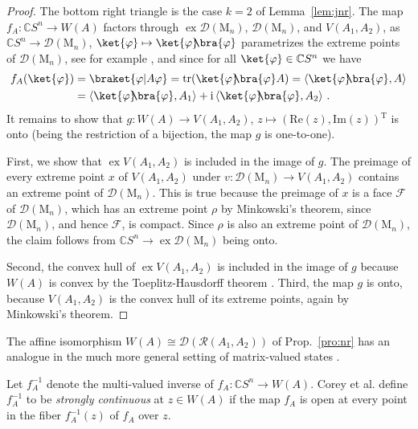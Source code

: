 \documentclass[a4paper,11pt,reqno]{amsart}
\newcommand{\C}{\mathbb{C}}
\newcommand{\M}{\mathrm{M}}
\newcommand{\cD}{\mathcal{D}}
\newcommand{\cF}{\mathcal{F}}
\newcommand{\cR}{\mathcal{R}}
\newcommand{\ii}{\mathrm{i}}
\renewcommand\Im{\mathrm{Im}}
\renewcommand\Re{\mathrm{Re}}
\newcommand{\tp}{{}^\mathrm{T}}
\DeclareMathOperator\ex{ex}
\DeclareMathOperator\tr{tr}
\theoremstyle{definition}
\theoremstyle{remark}
\numberwithin{equation}{section}
\begin{document}
\begin{proof}
The bottom right triangle is the case $k=2$ of Lemma~\ref{lem:jnr}. The 
map $f_A:\C S^n\to W(A)$ factors through $\ex\cD(\M_n)$, $\cD(\M_n)$, 
and $V(A_1,A_2)$, as $\C S^n\to\cD(\M_n)$, 
$\ket{\varphi}\mapsto\ket{\varphi}\!\!\bra{\varphi}$ parametrizes the 
extreme points of $\cD(\M_n)$, see for example 
\cite[Sec.~5.1]{BengtssonZyczkowski2017}, and since for all 
$\ket{\varphi}\in\C S^n$ we have
\begin{align*}
f_A(\ket{\varphi})
&=\braket{\varphi|A\varphi}
=\tr(\ket{\varphi}\!\!\bra{\varphi}A)
=\left\langle\ket{\varphi}\!\!\bra{\varphi},A\right\rangle\\
&=\left\langle\ket{\varphi}\!\!\bra{\varphi},A_1\right\rangle
+\ii\left\langle\ket{\varphi}\!\!\bra{\varphi},A_2\right\rangle\,.
\end{align*}
It remains to show that $g:W(A)\to V(A_1,A_2)$, $z\mapsto(\Re(z),\Im(z))\tp$ 
is onto (being the restriction of a bijection, the map $g$ is one-to-one). 
\par
%
First, we show that $\ex V(A_1,A_2)$ is included in the image of $g$. The 
preimage of every extreme point $x$ of $V(A_1,A_2)$ under 
$v:\cD(\M_n)\to V(A_1,A_2)$ contains an extreme point of $\cD(\M_n)$. This 
is true because the preimage of $x$ is a face $\cF$ of $\cD(\M_n)$, which 
has an extreme point $\rho$ by Minkowski's theorem, since $\cD(\M_n)$, and 
hence $\cF$, is compact. Since $\rho$ is also an extreme point of $\cD(\M_n)$, 
the claim follows from $\C S^n\to\ex\cD(\M_n)$ being onto. 
\par
%
Second, the convex hull of $\ex V(A_1,A_2)$ is included in the image of $g$
because $W(A)$ is convex by the Toeplitz-Hausdorff theorem 
\cite{Davis1971,MaierNetzer2024}. Third, the map $g$ is onto, because 
$V(A_1,A_2)$ is the convex hull of its extreme points, again by Minkowski's 
theorem.
\end{proof}
%
The affine isomorphism $W(A)\cong\cD(\cR(A_1,A_2))$ of Prop.~\ref{pro:nr} 
has an analogue in the much more general setting of matrix-valued states 
\cite[Thm.~5.1]{Farenick2004}. 
\par
%
Let $f_A^{-1}$ denote the multi-valued inverse of $f_A:\C S^n\to W(A)$. Corey 
et al. \cite{Corey-etal2013} define $f_A^{-1}$ to be \emph{strongly continuous} 
at $z\in W(A)$ if the map $f_A$ is open at every point in the fiber 
$f_A^{-1}(z)$ of $f_A$ over $z$. 
\par
%
\end{document}
